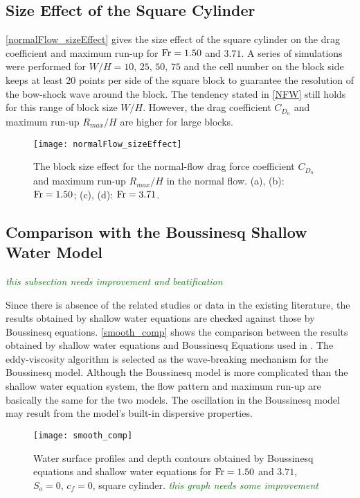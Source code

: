 \documentclass{jfm}
\newcommand{\fr}{{\rm{Fr}}}
\begin{document}
\subsection{Size Effect of the Square Cylinder}
\autoref{normalFlow_sizeEffect} gives the  size effect of the square cylinder on the drag coefficient and maximum run-up for $\fr=1.50$ and $3.71$. A series of simulations were performed for $W/H=10,\,25,\,50,\,75$ and the cell number on the block side keeps at least 20 points per side of the square block to guarantee the resolution of the bow-shock wave around the block. The tendency stated in \autoref{NFW} still holds for this range of block size $W/H$. However, the drag coefficient $C_{D_n}$ and maximum run-up $R_{max}/H$ are higher for large blocks.

\begin{figure}
	\centerline{\texttt{[image: normalFlow\_sizeEffect]}}
	\caption{The block size effect for the normal-flow drag force coefficient  $C_{D_n}$ and maximum run-up $R_{max}/H$ in the normal flow. (a), (b): $\fr=1.50$; (c), (d): $\fr=3.71$.} 
	\label{normalFlow_sizeEffect}
\end{figure}


\subsection{Comparison with the Boussinesq Shallow Water Model}
\textcolor{Green}{\textit{this subsection needs improvement and beatification}}

Since there is absence of the related studies or data in the existing literature, the results obtained by shallow water equations are checked against those by Boussinesq equations. \autoref{smooth_comp} shows the comparison between the results obtained by shallow water equations and Boussinesq Equations used in \cite{Shietal2012}. The eddy-viscosity algorithm is selected as the wave-breaking mechanism for the Boussinesq model.  Although the Boussinesq model is more complicated than the shallow water equation system, the flow pattern and maximum run-up are basically the same for the two models. The oscillation in the Boussinesq model may result from the model's built-in dispersive properties.

\begin{figure}
	\centerline{\texttt{[image: smooth\_comp]}}
	\caption{Water surface profiles and depth contours obtained by Boussinesq equations and shallow water equations for $\fr=1.50$ and $3.71$, $S_o=0$, $c_f=0$, square cylinder.  \textcolor{Green}{\textit{this graph needs some improvement}}} 
	\label{smooth_comp}
\end{figure}
\end{document}
